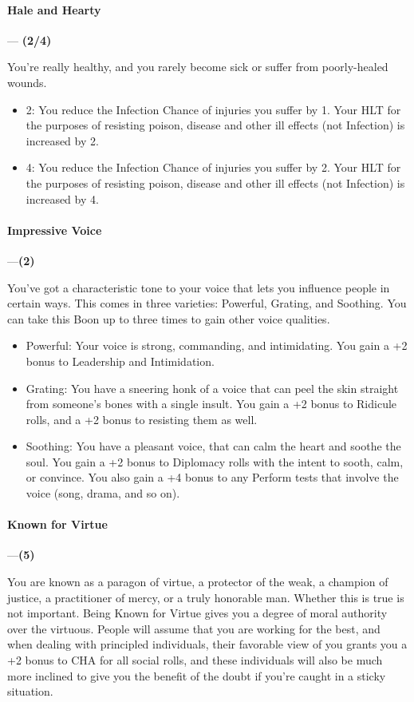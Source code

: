 \documentclass[oneside,11pt,english]{book}
\begin{document}
\paragraph{\label{boon:Hale and Hearty}Hale and Hearty}---\quad\textbf{ (2/4) }\par
You're really healthy, and you rarely become sick or suffer from poorly-healed wounds. 

\begin{itemize}
\item 2: You reduce the Infection Chance of injuries you suffer by 1. Your HLT for the purposes of resisting 
poison, disease and other ill effects (not Infection) is increased by 2. 
\item 4: You reduce the Infection Chance of injuries you suffer by 2. Your HLT for the purposes of resisting 
poison, disease and other ill effects (not Infection) is increased by 4. 
\end{itemize}
\paragraph{\label{boon:Impressive Voice}Impressive Voice}---\quad\textbf{(2)}\par
You've got a characteristic tone to your voice that lets you influence people in certain ways. This comes 
in three varieties: Powerful, Grating, and Soothing. You can take this Boon up to three times to gain other 
voice qualities. 

\begin{itemize}
\item Powerful: Your voice is strong, commanding, and intimidating. You gain a +2 bonus to Leadership and 
Intimidation. 
\item Grating: You have a sneering honk of a voice that can peel the skin straight from someone's bones with a 
single insult. You gain a +2 bonus to Ridicule rolls, and a +2 bonus to resisting them as well. 
\item Soothing: You have a pleasant voice, that can calm the heart and soothe the soul. You gain a +2 bonus to 
Diplomacy rolls with the intent to sooth, calm, or convince. You also gain a +4 bonus to any Perform 
tests that involve the voice (song, drama, and so on). 
\end{itemize}
\paragraph{\label{boon:Known for Virtue}Known for Virtue}---\quad\textbf{(5)}\par
You are known as a paragon of virtue, a protector of the weak, a champion of justice, a practitioner of 
mercy, or a truly honorable man. Whether this is true is not important. Being Known for Virtue gives you 
a degree of moral authority over the virtuous. People will assume that you are working for the best, and 
when dealing with principled individuals, their favorable view of you grants you a +2 bonus to CHA for 
all social rolls, and these individuals will also be much more inclined to give you the benefit of the doubt 
if you're caught in a sticky situation. 
\end{document}
